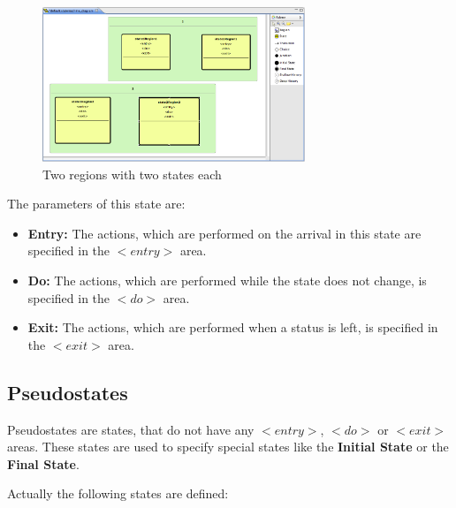 \begin{figure}[ht]
\center
\includegraphics[width=0.7\textwidth]{./Pictures/statesInRegions}
\caption{\label{fig:statesInRegions}Two regions with two states each}
\end{figure}

The parameters of this state are:

\begin{itemize}
\item \textbf{Entry:} The actions, which are performed on the arrival in this
state are specified in the $<entry>$ area. 
\item \textbf{Do:} The actions, which are performed while the state does not 
change, is specified in the $<do>$ area.
\item \textbf{Exit:} The actions, which are performed when a status is left, is
specified in the $<exit>$ area.
\end{itemize}

 
\newpage 

\subsection{Pseudostates}
\label{sec:Pseudostates}

Pseudostates are states, that do not have any $<entry>$, $<do>$ or $<exit>$
areas. These states are used to specify special states like the \textbf{Initial
State} or the \textbf{Final State}.

Actually the following states are defined:

